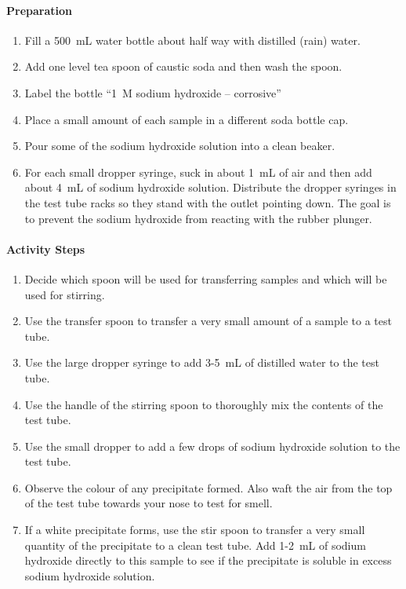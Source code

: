 \paragraph{Preparation}
\begin{enumerate}
\item{Fill a 500~mL water bottle about half way with distilled (rain) water.}
\item{Add one level tea spoon of caustic soda and then wash the spoon.}
\item{Label the bottle ``1~M sodium hydroxide -- corrosive''}
\item{Place a small amount of each sample in a different soda bottle cap.}
\item{Pour some of the sodium hydroxide solution into a clean beaker.}
\item{For each small dropper syringe, suck in about 1~mL of air and then add about 4~mL of sodium hydroxide solution. Distribute the dropper syringes in the test tube racks so they stand with the outlet pointing down. The goal is to prevent the sodium hydroxide from reacting with the rubber plunger.}
\end{enumerate}

\paragraph{Activity Steps}
\begin{enumerate}
\item{Decide which spoon will be used for transferring samples and which will be used for stirring.}
\item{Use the transfer spoon to transfer a very small amount of a sample to a test tube.}
\item{Use the large dropper syringe to add 3-5~mL of distilled water to the test tube.}
\item{Use the handle of the stirring spoon to thoroughly mix the contents of the test tube.}
\item{Use the small dropper to add a few drops of sodium hydroxide solution to the test tube.}
\item{Observe the colour of any precipitate formed. Also waft the air from the top of the test tube towards your nose to test for smell.}
\item{If a white precipitate forms, use the stir spoon to transfer a very small quantity of the precipitate to a clean test tube. Add 1-2~mL of sodium hydroxide directly to this sample to see if the precipitate is soluble in excess sodium hydroxide solution.}
\end{enumerate}

